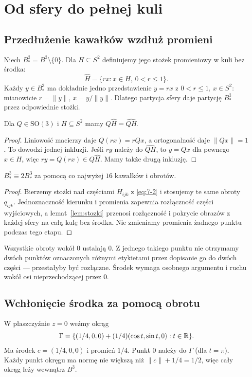 \section{Od sfery do pełnej kuli}
\subsection{Przedłużenie kawałków wzdłuż promieni}
Niech $B^3_*=B^3\setminus\{0\}$. Dla $H\subseteq S^2$ definiujemy jego stożek promieniowy w kuli bez środka:
\[
 \widehat H=\{rx:x\in H,\ 0<r\le1\}.
\]
Każdy $y\in B^3_*$ ma dokładnie jedno przedstawienie $y=rx$ z $0<r\le1$, $x\in S^2$: mianowicie $r=\|y\|$, $x=y/\|y\|$. Dlatego partycja sfery daje partycję $B^3_*$ przez odpowiednie stożki.
\begin{lemat}\label{lem:stozki}
Dla $Q\in\mathrm{SO}(3)$ i $H\subseteq S^2$ mamy $Q\widehat H=\widehat{QH}$.
\end{lemat}
\begin{proof}
Liniowość macierzy daje $Q(rx)=rQx$, a ortogonalność daje $\|Qx\|=1$. To dowodzi jednej inkluzji. Jeśli $ry$ należy do $\widehat{QH}$, to $y=Qx$ dla pewnego $x\in H$, więc $ry=Q(rx)\in Q\widehat H$. Mamy także drugą inkluzję.
\end{proof}
\begin{wniosek}\label{wn:kula-bez-srodka}
$B^3_*\equiv2B^3_*$ za pomocą co najwyżej $16$ kawałków i obrotów.
\end{wniosek}
\begin{proof}
Bierzemy stożki nad częściami $H_{ijk}$ z \eqref{eq:7-2} i stosujemy te same obroty $q_{ijk}$. Jednoznaczność kierunku i promienia zapewnia rozłączność części wyjściowych, a lemat~\ref{lem:stozki} przenosi rozłączność i pokrycie obrazów z każdej sfery na całą kulę bez środka. Nie zmieniamy promienia żadnego punktu podczas tego etapu.
\end{proof}
\begin{uwaga}
Wszystkie obroty wokół $0$ ustalają $0$. Z jednego takiego punktu nie otrzymamy dwóch punktów oznaczonych różnymi etykietami przez dopisanie go do dwóch części --- przestałyby być rozłączne. Środek wymaga osobnego argumentu i ruchu wokół osi nieprzechodzącej przez $0$.
\end{uwaga}

\subsection{Wchłonięcie środka za pomocą obrotu}
W płaszczyźnie $z=0$ weźmy okrąg
\[
 \Gamma=\{(1/4,0,0)+(1/4)(\cos t,\sin t,0):t\in\mathbb R\}.
\]
Ma środek $c=(1/4,0,0)$ i promień $1/4$. Punkt $0$ należy do $\Gamma$ (dla $t=\pi$). Każdy punkt okręgu ma normę nie większą niż $\|c\|+1/4=1/2$, więc cały okrąg leży wewnątrz $B^3$.

